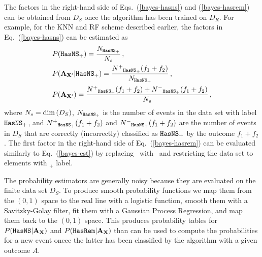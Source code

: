 The factors in the right-hand side of Eqs.~(\ref{bayes-hasns}) and (\ref{bayes-hasrem}) can be obtained from $D_{S}$ once the algorithm has been trained on $D_{R}$. For example, for the \ac{KNN} and \ac{RF} scheme described earlier, the factors in Eq.~(\ref{bayes-hasns}) can be estimated as  
%
\begin{align}
&P({{\tt HasNS}}_+)=\frac{N_{{{\tt HasNS}}_+}}{N_s}\,,\nonumber\\
&P({\bf A}_{{\bf X}'}|{{\tt HasNS}}_+)=\frac{N^+{}_{{{\tt HasNS}}_+}(f_1+f_2)}{N_{{{\tt HasNS}}_+}}\,,\nonumber\\
&P({\bf A}_{{\bf X}'})=\frac{N^+{}_{{{\tt HasNS}}_+}(f_1+f_2)+N^-{}_{{{\tt HasNS}}_+}(f_1+f_2)}{N_s}\,,\label{bayes-est}
\end{align}
%
where $N_s=\hbox{dim}\,(D_S)$, $N_{{{\tt HasNS}}_+}$ is the number of events in the data set with label ${{\tt HasNS}}_+$, and $N^+{}_{{{\tt HasNS}}_+}(f_1+f_2)$ and $N^-{}_{{{\tt HasNS}}_+}(f_1+f_2)$ are the number of events in $D_S$ that are correctly (incorrectly) classified as ${{{\tt HasNS}}_+}$ by the outcome $f_1+f_2$. The first factor in the right-hand side of Eq.~(\ref{bayes-hasrem}) can be evaluated similarly to Eq.~(\ref{bayes-est}) by replacing \hasns\ with \hasrem\ and restricting the data set to elements with \hasns$_+$ label.

The probability estimators are generally noisy because they are evaluated on the finite data set $D_S$. To produce smooth probability functions we map them from the $(0,1)$ space to the real line with a logistic function, smooth them with a Savitzky-Golay filter, fit them with a Gaussian Process Regression, and map them back to the $(0,1)$ space. This produces probability tables for 
$P({{\tt HasNS}}|{\bf A}_{\bf X})$ and $P({{\tt HasRem}}|{\bf A}_{\bf X})$ than can be used to compute the probabilities for a new event onece the latter has been classified by the algorithm with a given outcome $A$.  

~\\\\
